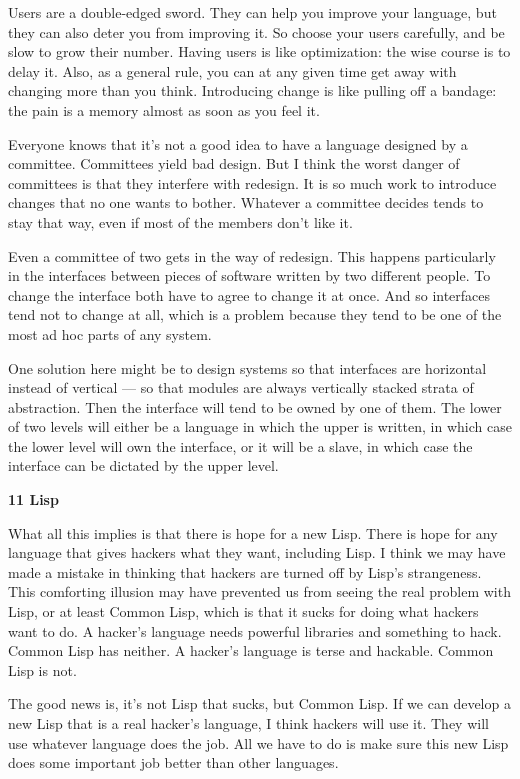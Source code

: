 Users are a double-edged sword. They can help you improve your language,
but they can also deter you from improving it. So choose your users
carefully, and be slow to grow their number. Having users is like
optimization: the wise course is to delay it. Also, as a general rule,
you can at any given time get away with changing more than you think.
Introducing change is like pulling off a bandage: the pain is a memory
almost as soon as you feel it.

Everyone knows that it's not a good idea to have a language designed by
a committee. Committees yield bad design. But I think the worst danger
of committees is that they interfere with redesign. It is so much work
to introduce changes that no one wants to bother. Whatever a committee
decides tends to stay that way, even if most of the members don't like
it.

Even a committee of two gets in the way of redesign. This happens
particularly in the interfaces between pieces of software written by two
different people. To change the interface both have to agree to change
it at once. And so interfaces tend not to change at all, which is a
problem because they tend to be one of the most ad hoc parts of any
system.

One solution here might be to design systems so that interfaces are
horizontal instead of vertical --- so that modules are always vertically
stacked strata of abstraction. Then the interface will tend to be owned
by one of them. The lower of two levels will either be a language in
which the upper is written, in which case the lower level will own the
interface, or it will be a slave, in which case the interface can be
dictated by the upper level.

\textbf{11 Lisp}

What all this implies is that there is hope for a new Lisp. There is
hope for any language that gives hackers what they want, including Lisp.
I think we may have made a mistake in thinking that hackers are turned
off by Lisp's strangeness. This comforting illusion may have prevented
us from seeing the real problem with Lisp, or at least Common Lisp,
which is that it sucks for doing what hackers want to do. A hacker's
language needs powerful libraries and something to hack. Common Lisp has
neither. A hacker's language is terse and hackable. Common Lisp is not.

The good news is, it's not Lisp that sucks, but Common Lisp. If we can
develop a new Lisp that is a real hacker's language, I think hackers
will use it. They will use whatever language does the job. All we have
to do is make sure this new Lisp does some important job better than
other languages.

